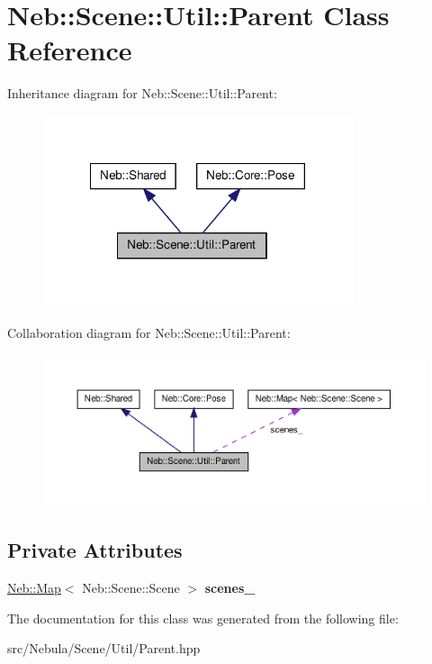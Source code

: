\hypertarget{classNeb_1_1Scene_1_1Util_1_1Parent}{\section{\-Neb\-:\-:\-Scene\-:\-:\-Util\-:\-:\-Parent \-Class \-Reference}
\label{classNeb_1_1Scene_1_1Util_1_1Parent}
}


\-Inheritance diagram for \-Neb\-:\-:\-Scene\-:\-:\-Util\-:\-:\-Parent\-:\nopagebreak
\begin{figure}[H]
\begin{center}
\leavevmode
\includegraphics[width=258pt]{classNeb_1_1Scene_1_1Util_1_1Parent__inherit__graph}
\end{center}
\end{figure}


\-Collaboration diagram for \-Neb\-:\-:\-Scene\-:\-:\-Util\-:\-:\-Parent\-:\nopagebreak
\begin{figure}[H]
\begin{center}
\leavevmode
\includegraphics[width=350pt]{classNeb_1_1Scene_1_1Util_1_1Parent__coll__graph}
\end{center}
\end{figure}
\subsection*{\-Private \-Attributes}
\begin{DoxyCompactItemize}
\item 
\hypertarget{classNeb_1_1Scene_1_1Util_1_1Parent_a06bece1fce87446527a42b8e585abe19}{\hyperlink{classNeb_1_1Map}{\-Neb\-::\-Map}$<$ \-Neb\-::\-Scene\-::\-Scene $>$ {\bfseries scenes\-\_\-}}\label{classNeb_1_1Scene_1_1Util_1_1Parent_a06bece1fce87446527a42b8e585abe19}

\end{DoxyCompactItemize}


\-The documentation for this class was generated from the following file\-:\begin{DoxyCompactItemize}
\item 
src/\-Nebula/\-Scene/\-Util/\-Parent.\-hpp\end{DoxyCompactItemize}
